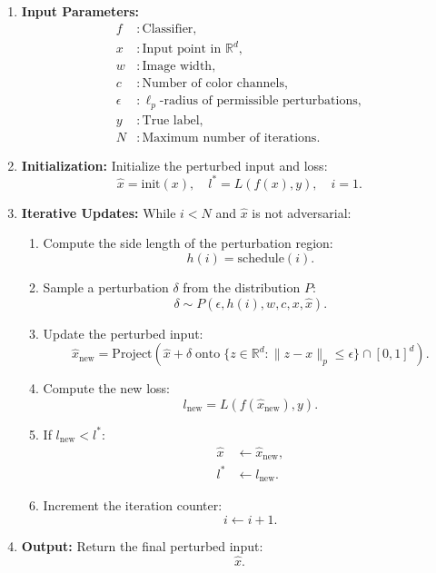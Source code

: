 \begin{enumerate}
    \item \textbf{Input Parameters:}  
    \begin{align*}
    f &: \text{Classifier}, \\
    x &: \text{Input point in } \mathbb{R}^d, \\
    w &: \text{Image width}, \\
    c &: \text{Number of color channels}, \\
    \epsilon &: \ell_p\text{-radius of permissible perturbations}, \\
    y &: \text{True label}, \\
    N &: \text{Maximum number of iterations}.
    \end{align*}

    \item \textbf{Initialization:}  
    Initialize the perturbed input and loss:  
    \[
    \hat{x} = \text{init}(x), \quad l^* = L(f(x), y), \quad i = 1.
    \]

    \item \textbf{Iterative Updates:}  
    While $i < N$ and $\hat{x}$ is not adversarial:
    \begin{enumerate}
        \item Compute the side length of the perturbation region:
        \[
        h(i) = \text{schedule}(i).
        \]
        \item Sample a perturbation $\delta$ from the distribution $P$:  
        \[
        \delta \sim P(\epsilon, h(i), w, c, x, \hat{x}).
        \]
        \item Update the perturbed input:  
        \[
        \hat{x}_{\text{new}} = \text{Project}\left( \hat{x} + \delta \; \text{onto} \; \{z \in \mathbb{R}^d : \|z - x\|_p \leq \epsilon\} \cap [0, 1]^d \right).
        \]
        \item Compute the new loss:
        \[
        l_{\text{new}} = L(f(\hat{x}_{\text{new}}), y).
        \]
        \item If $l_{\text{new}} < l^*$:
        \begin{align*}
        \hat{x} &\gets \hat{x}_{\text{new}}, \\
        l^* &\gets l_{\text{new}}.
        \end{align*}
        \item Increment the iteration counter:
        \[
        i \gets i + 1.
        \]
    \end{enumerate}

    \item \textbf{Output:}  
    Return the final perturbed input:  
    \[
    \hat{x}.
    \]
\end{enumerate}



